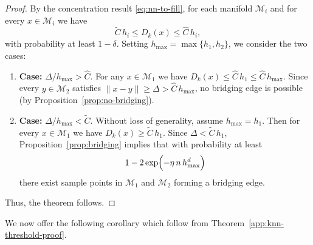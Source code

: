 \documentclass{article}
\theoremstyle{plain}
\theoremstyle{definition}
\theoremstyle{remark}
\begin{document}
\begin{proof}
By the concentration result \eqref{eq:nn-to-fill}, for each manifold \(\mathcal{M}_i\) and for every \(x\in \mathcal{M}_i\) we have
\[
\widetilde{C}\,h_i \le D_k(x) \le \widehat{C}\,h_i,
\]
with probability at least \(1-\delta\). Setting \(h_{\max} = \max\{h_1,h_2\}\), we consider the two cases:
%
\begin{enumerate}
    \item \textbf{Case:} \(\Delta/h_{\max} > \widehat{C}\). For any \(x\in \mathcal{M}_1\) we have \(D_k(x)\le \widehat{C}\,h_1 \le \widehat{C}\,h_{\max}\). Since every \(y\in \mathcal{M}_2\) satisfies \(\|x-y\| \ge \Delta > \widehat{C}\,h_{\max}\), no bridging edge is possible (by Proposition~\ref{prop:no-bridging}).
    \medskip
    \item \textbf{Case:} \(\Delta/h_{\max} < \widetilde{C}\). Without loss of generality, assume \(h_{\max}=h_1\). Then for every \(x\in \mathcal{M}_1\) we have \(D_k(x)\ge \widetilde{C}\,h_1\). Since \(\Delta < \widetilde{C}\,h_1\), Proposition~\ref{prop:bridging} implies that with probability at least 
    \[
    1-2\exp\Bigl(-\eta\,n\,h_{\max}^d\Bigr)
    \]
    there exist sample points in \(\mathcal{M}_1\) and \(\mathcal{M}_2\) forming a bridging edge.
\end{enumerate}
Thus, the theorem follows.
\end{proof}



\medskip

We now offer the following corollary which follow from Theorem~\ref{app:knn-threshold-proof}.

\medskip
\end{document}
